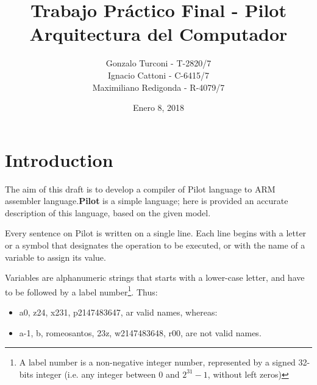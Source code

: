\documentclass[12pt,spanish]{article}
\begin{document}
 
 
\title{Trabajo Práctico Final - Pilot \\
 \large Arquitectura del Computador
}
\date{Enero 8, 2018}
\author{Gonzalo Turconi - T-2820/7 \\
        Ignacio Cattoni - C-6415/7 \\
        Maximiliano Redigonda - R-4079/7}
\maketitle

\section{Introduction}
The aim of this draft is to develop a compiler of Pilot language to ARM assembler language.\textbf{Pilot} is a simple language; here is provided an accurate description of this language, based on the given model.

Every sentence on Pilot is written on a single line. Each line begins with a letter or a symbol that designates the operation to be executed, or with the name of a variable to assign its value.

Variables are alphanumeric strings that starts with a lower-case letter, and have to be followed by a label number\footnote{A label number is a non-negative integer number, represented by a signed 32-bits integer (i.e. any integer between $0$ and $2^{31}-1$, without left zeros)}. Thus:
\begin{itemize}
\item{a0, z24, x231, p2147483647, ar valid names, whereas:}
\item{a-1, b, romeosantos, 23z, w2147483648, r00, are not valid names.}
\end{itemize}
\end{document}

